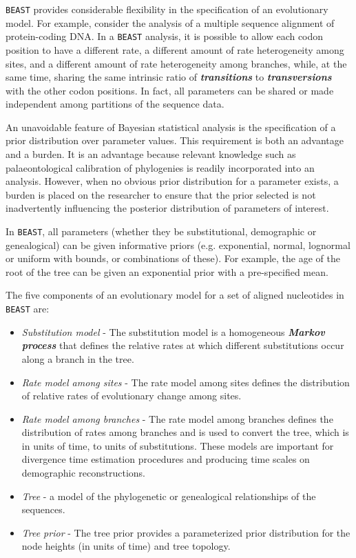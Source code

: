 \documentclass[cup7b, english]{cupbook}
\begin{document}
\texttt{BEAST} provides considerable flexibility in the specification of an
evolutionary model. For example, consider the analysis of a multiple
sequence alignment of protein-coding DNA. In a \texttt{BEAST} analysis, it is possible
to allow each codon position to have a different rate, a different
amount of rate heterogeneity among sites, and a different amount of
rate heterogeneity among branches, while, at the same time, sharing
the same intrinsic ratio of \textbf{\textit{transitions}} to \textbf{\textit{transversions}} with the
other codon positions. In fact, all parameters can be shared or made
independent among partitions of the sequence data.

An unavoidable feature of Bayesian statistical analysis is the specification
of a prior distribution over parameter values. This requirement is
both an advantage and a burden. It is an advantage because relevant
knowledge such as palaeontological calibration of phylogenies is readily
incorporated into an analysis. However, when no obvious prior distribution
for a parameter exists, a burden is placed on the researcher to ensure
that the prior selected is not inadvertently influencing the posterior
distribution of parameters of interest.

In \texttt{BEAST}, all parameters (whether they be substitutional, demographic or genealogical)
can be given informative priors (e.g. exponential, normal, lognormal
or uniform with bounds, or combinations of these). For example, the age of the root of the tree
can be given an exponential prior with a pre-specified mean.

The five components of an evolutionary model for a set of aligned
nucleotides in \texttt{BEAST} are:

\begin{itemize}
\item \emph{Substitution model} - The substitution model is a homogeneous \textbf{\textit{Markov
process}} that defines the relative rates at which different substitutions
occur along a branch in the tree.
\item \emph{Rate model among sites} - The rate model among sites defines the distribution
of relative rates of evolutionary change among sites.
\item \emph{Rate model among branches} - The rate model among branches defines
the distribution of rates among branches and is used to convert the
tree, which is in units of time, to units of substitutions. These
models are important for divergence time estimation procedures and producing time
scales on demographic reconstructions.
\item \emph{Tree} - a model of the phylogenetic or genealogical relationships of
the sequences.
\item \emph{Tree prior} - The tree prior provides a parameterized prior distribution
for the node heights (in units of time) and tree topology.
\end{itemize}
\end{document}

